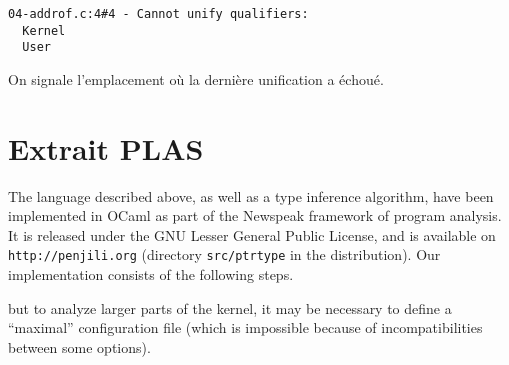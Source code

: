 \begin{verbatim}
04-addrof.c:4#4 - Cannot unify qualifiers:
  Kernel
  User
\end{verbatim}

On signale l'emplacement où la dernière unification a échoué.

\section*{Extrait PLAS}

The language described above, as well as a type inference algorithm, have been
implemented in OCaml as part of the Newspeak framework of program
analysis\cite{newspeak}. It is released under the GNU Lesser General Public
License, and is available on \texttt{http://penjili.org} (directory
\texttt{src/ptrtype} in the distribution). Our implementation consists of the
following steps.

but to analyze larger parts of the kernel, it may be
necessary to define a ``maximal'' configuration file (which is impossible
because of incompatibilities between some options).


